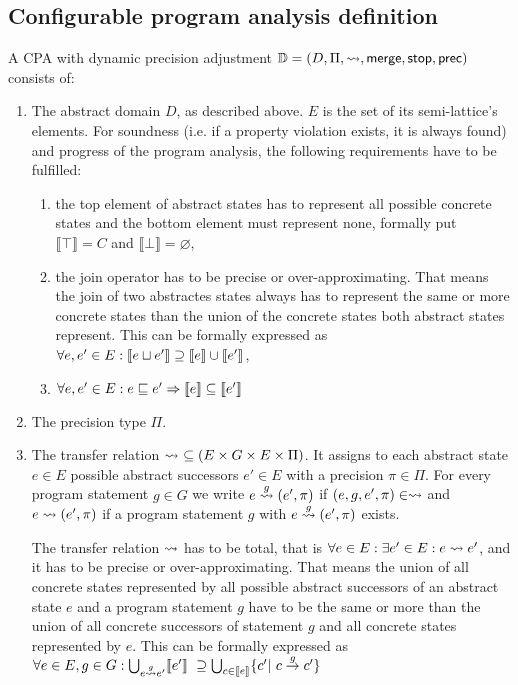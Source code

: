 \subsection{Configurable program analysis definition}
A CPA with dynamic precision adjustment $\mathbb{D} = (D, \Pi, \rightsquigarrow, \operatorname{\operatorname{\mathsf{merge}}}, \operatorname{\operatorname{\mathsf{stop}}}, \operatorname{\operatorname{\mathsf{prec}}} )$ consists of:

\begin{enumerate}[leftmargin=*, label=\arabic*.]
\item
The abstract domain $D$, as described above. $E$ is the set of its semi-lattice's elements.
For soundness (i.e. if a property violation exists, it is always found) and progress of the program analysis, the following requirements have to be fulfilled:\cite{Beyer2007}\cite{Beyer2008}
\begin{enumerate}[label=\alph*)]

\item
the top element of abstract states has to represent all possible concrete states and the bottom element must represent none, formally put $\llbracket \top \rrbracket = C$ and $\llbracket \bot \rrbracket = \varnothing$,

\item
the join operator has to be precise or over-approximating. That means the join of two abstractes states always has to represent the same or more concrete states than the union of the concrete states both abstract states represent. This can be formally expressed as $\forall e, e' \in E: \llbracket e \sqcup e' \rrbracket \supseteq \llbracket e \rrbracket \cup \llbracket e' \rrbracket$,

\item
$\forall e, e' \in E : e \sqsubseteq e' \Rightarrow \llbracket e \rrbracket \subseteq \llbracket e' \rrbracket$
\end{enumerate}

\item
The precision type $\Pi$.

\item
The transfer relation $\transfer\ \subseteq (E \times G \times E \times \Pi)$. It assigns to each abstract state $e \in E$ possible abstract successors $e' \in E$ with a precision $\pi \in \Pi$.
For every program statement $g \in G$ we write $e \overset{g}{\rightsquigarrow} (e', \pi)$ if $(e, g, e', \pi) \in \rightsquigarrow$ and $e \rightsquigarrow (e', \pi)$ if a program statement $g$ with $e \overset{g}{\rightsquigarrow} (e', \pi)$ exists.

The transfer relation $\rightsquigarrow$ has to be total, that is $\forall e \in E: \exists e' \in E: e \rightsquigarrow e'$, and
it has to be precise or over-approximating. That means the union of all concrete states represented by all possible abstract successors of an abstract state $e$ and a program statement $g$ have to be the same or more than the union of all concrete successors of statement $g$ and all concrete states represented by $e$.
This can be formally expressed as $\forall e \in E, g \in G: \bigcup_{e \gtransfer e'} \llbracket e' \rrbracket\ \supseteq \bigcup_{c \in \llbracket e \rrbracket} \{ c' |\ c \overset{g}{\rightarrow} c' \}$


\end{enumerate}
